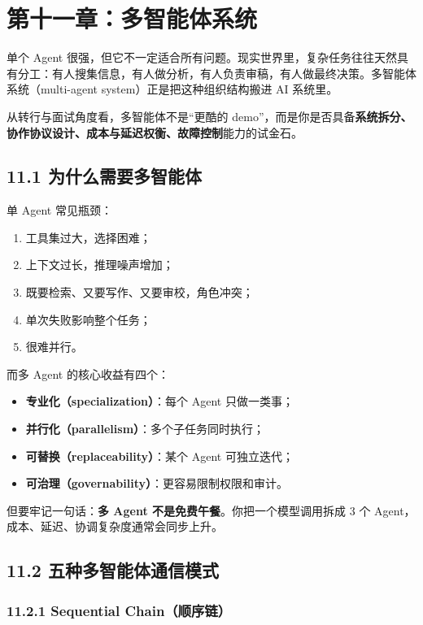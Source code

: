 \chapter{第十一章：多智能体系统}

单个 Agent 很强，但它不一定适合所有问题。现实世界里，复杂任务往往天然具有分工：有人搜集信息，有人做分析，有人负责审稿，有人做最终决策。多智能体系统（multi-agent system）正是把这种组织结构搬进 AI 系统里。


从转行与面试角度看，多智能体不是``更酷的 demo''，而是你是否具备\textbf{系统拆分、协作协议设计、成本与延迟权衡、故障控制}能力的试金石。


\section{11.1 为什么需要多智能体}

单 Agent 常见瓶颈：


\begin{enumerate}[leftmargin=2em]
\item 工具集过大，选择困难；
\item 上下文过长，推理噪声增加；
\item 既要检索、又要写作、又要审校，角色冲突；
\item 单次失败影响整个任务；
\item 很难并行。
\end{enumerate}

而多 Agent 的核心收益有四个：


\begin{itemize}[leftmargin=2em]
\item \textbf{专业化（specialization）}：每个 Agent 只做一类事；
\item \textbf{并行化（parallelism）}：多个子任务同时执行；
\item \textbf{可替换（replaceability）}：某个 Agent 可独立迭代；
\item \textbf{可治理（governability）}：更容易限制权限和审计。
\end{itemize}

但要牢记一句话：\textbf{多 Agent 不是免费午餐}。你把一个模型调用拆成 3 个 Agent，成本、延迟、协调复杂度通常会同步上升。


\section{11.2 五种多智能体通信模式}

\subsection{11.2.1 Sequential Chain（顺序链）}

